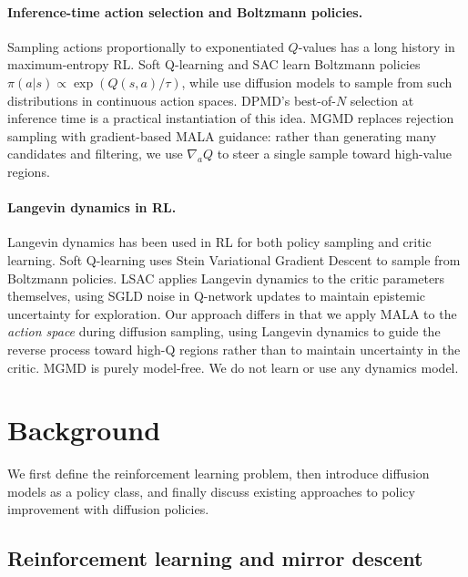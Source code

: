 \documentclass{article}
\theoremstyle{plain}
\theoremstyle{definition}
\theoremstyle{remark}
\begin{document}
\paragraph{Inference-time action selection and Boltzmann policies.}
Sampling actions proportionally to exponentiated $Q$-values has a long history in maximum-entropy RL.
Soft Q-learning \citep{haarnoja2017sql} and SAC \citep{haarnoja2018sac} learn Boltzmann policies $\pi(a|s) \propto \exp(Q(s,a)/\tau)$, while \citet{lu2024diffusionql} use diffusion models to sample from such distributions in continuous action spaces.
DPMD's best-of-$N$ selection at inference time is a practical instantiation of this idea.
MGMD replaces rejection sampling with gradient-based MALA guidance: rather than generating many candidates and filtering, we use $\nabla_a Q$ to steer a single sample toward high-value regions.

\paragraph{Langevin dynamics in RL.}
Langevin dynamics has been used in RL for both policy sampling and critic learning.
Soft Q-learning \citep{haarnoja2017sql} uses Stein Variational Gradient Descent to sample from Boltzmann policies.
LSAC \citep{lsac2025} applies Langevin dynamics to the critic parameters themselves, using SGLD noise in Q-network updates to maintain epistemic uncertainty for exploration.
Our approach differs in that we apply MALA to the \emph{action space} during diffusion sampling, using Langevin dynamics to guide the reverse process toward high-Q regions rather than to maintain uncertainty in the critic.
MGMD is purely model-free. We do not learn or use any dynamics model.

\section{Background}
\label{sec:background}

We first define the reinforcement learning problem, then introduce diffusion models as a policy class, and finally discuss existing approaches to policy improvement with diffusion policies.

\subsection{Reinforcement learning and mirror descent}
\label{sec:rl-background}
\end{document}
